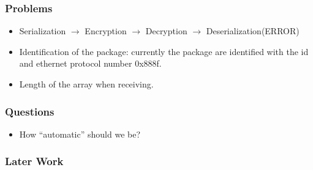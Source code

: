 \documentclass[11pt]{beamer}
\begin{document}
\begin{frame}
\begin{multicols}{2}
\end{multicols}
\end{frame}

\begin{frame}\frametitle{Problems}
\begin{itemize}
\item Serialization $\rightarrow$ Encryption $\rightarrow$ Decryption $\rightarrow$ Deserialization(ERROR)

\item Identification of the package: currently the package are identified with the  id and ethernet protocol number 0x888f.

\item Length of the array when receiving.
\end{itemize}
\end{frame}

\begin{frame}\frametitle{Questions}
\begin{itemize}
\item How ``automatic'' should we be?

\end{itemize}
\end{frame}

\begin{frame}\frametitle{Later Work}

\end{frame}
\end{document}

